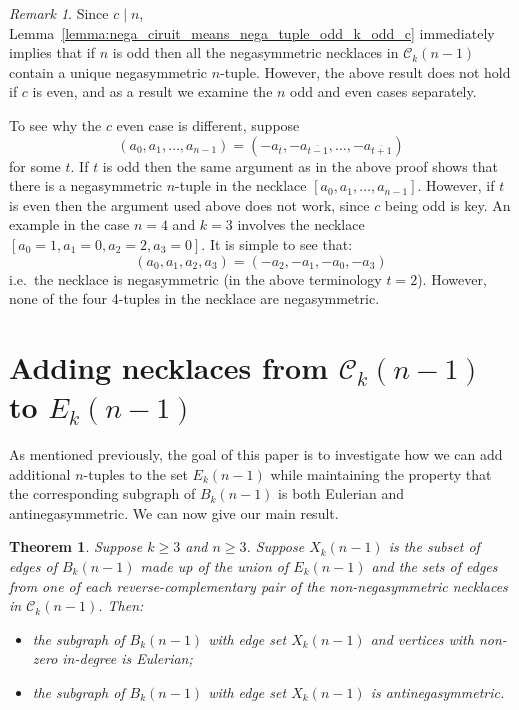 \documentclass[a4paper,11pt]{article}
\theoremstyle{plain}
\newtheorem{theorem}[lemma]{Theorem}
\theoremstyle{definition}
\theoremstyle{remark}
\newtheorem{remark}{Remark}[section]
\begin{document}
\begin{remark}  \label{remark:n_even_counterexample}  \label{remark:n_odd_OK}
Since $c\mid n$, Lemma~\ref{lemma:nega_ciruit_means_nega_tuple_odd_k_odd_c} immediately implies
that if $n$ is odd then all the negasymmetric necklaces in $\mathcal{C}_k(n-1)$ contain a unique
negasymmetric $n$-tuple. However, the above result does not hold if $c$ is even, and as a result we
examine the $n$ odd and even cases separately.

To see why the $c$ even case is different, suppose
\[ (a_0,a_1,\dots,a_{n-1}) = (-a_{\overline{t}},-a_{\overline{t-1}},\dots,-a_{\overline{t+1}}) \]
for some $t$.  If $t$ is odd then the same argument as in the above proof shows that there is a
negasymmetric $n$-tuple in the necklace $[a_0,a_1,\dots,a_{n-1}]$.  However, if $t$ is even then
the argument used above does not work, since $c$ being odd is key.  An example in the case $n=4$
and $k=3$ involves the necklace $[a_0=1,a_1=0,a_2=2,a_3=0]$.  It is simple to see that:
\[ (a_0,a_1,a_2,a_3)=(-a_2,-a_1,-a_0,-a_3) \]
i.e.\ the necklace is negasymmetric (in the above terminology $t=2$).  However, none of the four
4-tuples in the necklace are negasymmetric.
\end{remark}

\section{Adding necklaces from \texorpdfstring{$\mathcal{C}_k(n-1)$}{Ck(n-1)} to \texorpdfstring{$E_k(n-1)$}{Ek(n-1)}}  \label{section:adding_tuples}

As mentioned previously, the goal of this paper is to investigate how we can add additional
$n$-tuples to the set $E_k(n-1)$ while maintaining the property that the corresponding subgraph of
$B_k(n-1)$ is both Eulerian and antinegasymmetric. We can now give our main result.

\begin{theorem}  \label{theorem:Xkn-1_is_Eulerian}
Suppose $k\geq3$ and $n\geq 3$. Suppose $X_k(n-1)$ is the subset of edges of $B_k(n-1)$ made up of
the union of $E_k(n-1)$ and the sets of edges from one of each reverse-complementary pair of the
non-negasymmetric necklaces in $\mathcal{C}_k(n-1)$. Then:

\begin{itemize}
\item[(i)] the subgraph of $B_k(n-1)$ with edge set $X_k(n-1)$ and vertices with non-zero
    in-degree is Eulerian;
\item[(ii)] the subgraph of $B_k(n-1)$ with edge set $X_k(n-1)$ is antinegasymmetric.
\end{itemize}
\end{theorem}
\end{document}
